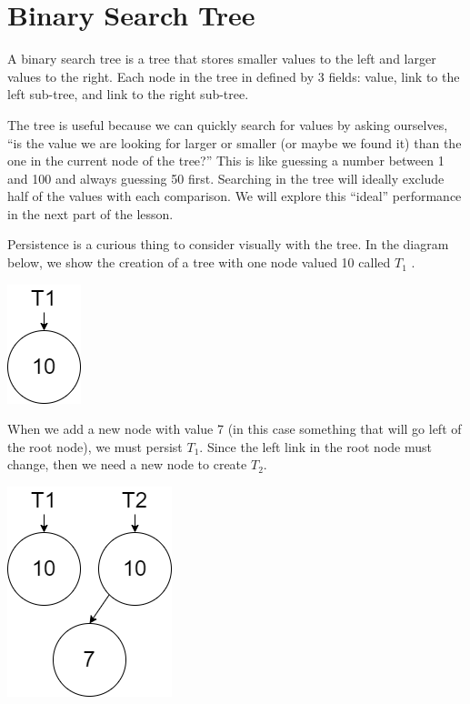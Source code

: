 \documentclass[
]{book}
\begin{document}
\hypertarget{binary-search-tree}{%
\section{Binary Search Tree}\label{binary-search-tree}}

A binary search tree is a tree that stores smaller values to the left and larger values to the right. Each node in the tree in defined by 3 fields: value, link to the left sub-tree, and link to the right sub-tree.

The tree is useful because we can quickly search for values by asking ourselves, ``is the value we are looking for larger or smaller (or maybe we found it) than the one in the current node of the tree?'' This is like guessing a number between 1 and 100 and always guessing 50 first. Searching in the tree will ideally exclude half of the values with each comparison. We will explore this ``ideal'' performance in the next part of the lesson.

Persistence is a curious thing to consider visually with the tree. In the diagram below, we show the creation of a tree with one node valued 10 called \(T_1\) .

\includegraphics{images/bst_1.drawio.png}

When we add a new node with value 7 (in this case something that will go left of the root node), we must persist \(T_1\). Since the left link in the root node must change, then we need a new node to create \(T_2\).

\includegraphics{images/bst_2.drawio.png}
\end{document}
